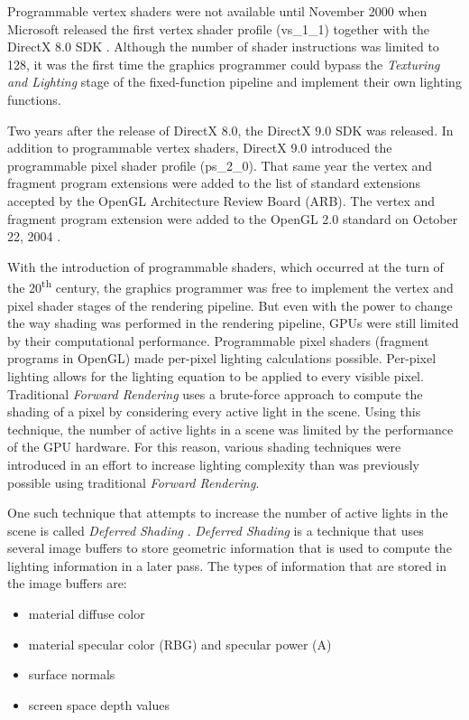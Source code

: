 Programmable vertex shaders were not available until November 2000 when Microsoft released the first vertex shader profile (vs\_1\_1) together with the DirectX 8.0 SDK \parencite{3_van_oosten_2014}. Although the number of shader instructions was limited to 128, it was the first time the graphics programmer could bypass the \emph{Texturing and Lighting} stage of the fixed-function pipeline and implement their own lighting functions.

Two years after the release of DirectX 8.0, the DirectX 9.0 SDK was released. In addition to programmable vertex shaders, DirectX 9.0 introduced the programmable pixel shader profile (ps\_2\_0). That same year the vertex and fragment program extensions were added to the list of standard extensions accepted by the OpenGL Architecture Review Board (ARB). The vertex and fragment program extension were added to the OpenGL 2.0 standard on October 22, 2004 \parencite{6_segalakeley_2004}.

With the introduction of programmable shaders, which occurred at the turn of the 20\textsuperscript{th} century, the graphics programmer was free to implement the vertex and pixel shader stages of the rendering pipeline. But even with the power to change the way shading was performed in the rendering pipeline, GPUs were still limited by their computational performance. Programmable pixel shaders (fragment programs in OpenGL) made per-pixel lighting calculations possible. Per-pixel lighting allows for the lighting equation to be applied to every visible pixel. Traditional \emph{Forward Rendering} uses a brute-force approach to compute the shading of a pixel by considering every active light in the scene. Using this technique, the number of active lights in a scene was limited by the performance of the GPU hardware. For this reason, various shading techniques were introduced in an effort to increase lighting complexity than was previously possible using traditional \emph{Forward Rendering}. 

One such technique that attempts to increase the number of active lights in the scene is called \emph{Deferred Shading} \parencite{12_saitotakahashi_1990, 8_geldreichpritchard_2004, 9_shishkovtsov_2006, 10_vanderleeuw_2007, 11_mittring_2009}. \emph{Deferred Shading} is a technique that uses several image buffers to store geometric information that is used to compute the lighting information in a later pass. The types of information that are stored in the image buffers are:

\begin{itemize}
\item material diffuse color
\item material specular color (RBG) and specular power (A)
\item surface normals
\item screen space depth values
\end{itemize}

